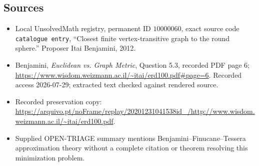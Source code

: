 \documentclass[11pt]{article}
\begin{document}
\subsection{Sources}
\begin{itemize}
\item Local UnsolvedMath registry, permanent ID \(10000060\), exact source code \texttt{catalogue entry}, ``Closest finite vertex-transitive graph to the round sphere.'' Proposer Itai Benjamini, 2012.
\item Benjamini, \emph{Euclidean vs. Graph Metric}, Question 5.3, recorded PDF page 6; \url{https://www.wisdom.weizmann.ac.il/~itai/erd100.pdf#page=6}. Recorded access 2026-07-29; extracted text checked against rendered source.
\item Recorded preservation copy: \url{https://arquivo.pt/noFrame/replay/20201231041538id_/http://www.wisdom.weizmann.ac.il/~itai/erd100.pdf}.
\item Supplied OPEN-TRIAGE summary mentions Benjamini--Finucane--Tessera approximation theory without a complete citation or theorem resolving this minimization problem.
\end{itemize}
\end{document}
